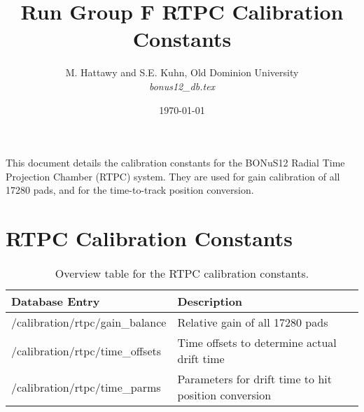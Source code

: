 \documentclass[12pt]{article}
\begin{document}
\title{Run Group F RTPC Calibration Constants}

\vskip 0.5cm

\author{M. Hattawy and S.E. Kuhn, Old Dominion University\\[0.1ex]
{\it bonus12\_db.tex}}


\date \today
%
\maketitle

This document details the calibration constants for the BONuS12 Radial Time Projection Chamber (RTPC) system. They are used for gain calibration of all 17280 pads, and for the time-to-track position conversion.

\section*{}

\section{RTPC Calibration Constants}


\begin{table}[htbp]
\begin{center}
\begin{tabular} {|l|l|} \hline
Database Entry                                      & Description \\ \hline
/calibration/rtpc/gain\_balance           & Relative gain of all 17280 pads \\ \hline
/calibration/rtpc/time\_offsets           & Time offsets to determine actual drift time \\ \hline
/calibration/rtpc/time\_parms              & Parameters for drift time to hit position conversion \\ \hline
\end{tabular}
\caption{Overview table for the RTPC calibration constants.}
\label{rtcp-parms}
\end{center}
\end{table}
\end{document}
